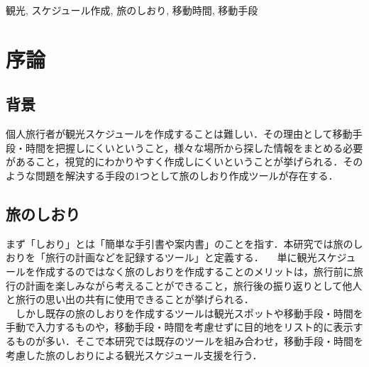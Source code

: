 \documentclass{funthesis}
\begin{document}
\begin{jkeyword}
観光, スケジュール作成, 旅のしおり, 移動時間, 移動手段
\end{jkeyword}

\tableofcontents %


\chapter{序論} %



\section{背景} %

個人旅行者が観光スケジュールを作成することは難しい．その理由として移動手段・時間を把握しにくいということ，様々な場所から探した情報をまとめる必要があること，視覚的にわかりやすく作成しにくいということが挙げられる．そのような問題を解決する手段の1つとして旅のしおり作成ツールが存在する．\\



\section{旅のしおり}
まず「しおり」とは「簡単な手引書や案内書」のことを指す．本研究では旅のしおりを「旅行の計画などを記録するツール」と定義する．
　単に観光スケジュールを作成するのではなく旅のしおりを作成することのメリットは，旅行前に旅行の計画を楽しみながら考えることができること，旅行後の振り返りとして他人と旅行の思い出の共有に使用できることが挙げられる．\\
　しかし既存の旅のしおりを作成するツールは観光スポットや移動手段・時間を手動で入力するものや，移動手段・時間を考慮せずに目的地をリスト的に表示するものが多い．そこで本研究では既存のツールを組み合わせ，移動手段・時間を考慮した旅のしおりによる観光スケジュール支援を行う．\\
\end{document}
